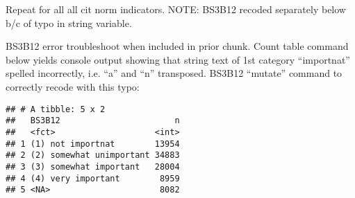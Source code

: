 \documentclass[]{article}
\newenvironment{Shaded}{\begin{snugshade}}{\end{snugshade}}
\newcommand{\CommentTok}[1]{\textcolor[rgb]{0.56,0.35,0.01}{\textit{#1}}}
\newcommand{\DataTypeTok}[1]{\textcolor[rgb]{0.13,0.29,0.53}{#1}}
\newcommand{\KeywordTok}[1]{\textcolor[rgb]{0.13,0.29,0.53}{\textbf{#1}}}
\newcommand{\NormalTok}[1]{#1}
\newcommand{\OperatorTok}[1]{\textcolor[rgb]{0.81,0.36,0.00}{\textbf{#1}}}
\newcommand{\StringTok}[1]{\textcolor[rgb]{0.31,0.60,0.02}{#1}}
\begin{document}
Repeat for all all cit norm indicators. NOTE: BS3B12 recoded separately
below b/c of typo in string variable.

\begin{Shaded}
\end{Shaded}

BS3B12 error troubleshoot when included in prior chunk. Count table
command below yields console output showing that string text of 1st
category ``importnat'' spelled incorrectly, i.e. ``a'' and ``n''
transposed. BS3B12 ``mutate'' command to correctly recode with this
typo:

\begin{Shaded}
\end{Shaded}

\begin{verbatim}
## # A tibble: 5 x 2
##   BS3B12                       n
##   <fct>                    <int>
## 1 (1) not importnat        13954
## 2 (2) somewhat unimportant 34883
## 3 (3) somewhat important   28004
## 4 (4) very important        8959
## 5 <NA>                      8082
\end{verbatim}

\begin{Shaded}
\end{Shaded}
\end{document}
